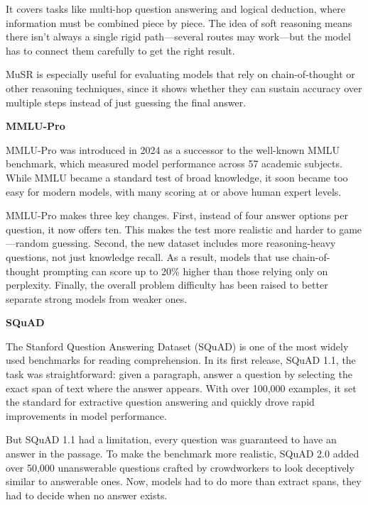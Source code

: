 It covers tasks like multi-hop question answering and logical deduction, where information must be combined piece by piece. The idea of soft
reasoning means there isn’t always a single rigid path—several routes may work—but the model has to connect them carefully to get the right result.

MuSR is especially useful for evaluating models that rely on chain-of-thought or other reasoning techniques, since it shows whether
they can sustain accuracy over multiple steps instead of just guessing the final answer.

\textbf{MMLU-Pro}


MMLU-Pro was introduced in 2024 as a successor to the well-known MMLU benchmark, which measured model performance across 57 academic subjects.
While MMLU became a standard test of broad knowledge, it soon became too easy for modern models, with many scoring at or above human expert levels.

MMLU-Pro makes three key changes. First, instead of four answer options per question, it now offers ten. This makes the test more realistic and
harder to game—random guessing. Second, the new dataset includes more reasoning-heavy questions, not just knowledge recall.
As a result, models that use chain-of-thought prompting can score up to 20\% higher than those relying only on perplexity. 
Finally, the overall problem difficulty has been raised to better separate strong models from weaker ones.

\textbf{SQuAD}


The Stanford Question Answering Dataset (SQuAD) is one of the most widely used benchmarks for reading comprehension. In its first release,
SQuAD 1.1, the task was straightforward: given a paragraph, answer a question by selecting the exact span of text where the answer appears.
With over 100,000 examples, it set the standard for extractive question answering and quickly drove rapid improvements in model performance.

But SQuAD 1.1 had a limitation, every question was guaranteed to have an answer in the passage. To make the benchmark more realistic, SQuAD 2.0
added over 50,000 unanswerable questions crafted by crowdworkers to look deceptively similar to answerable ones. Now, models had to do more
than extract spans, they had to decide when no answer exists.

